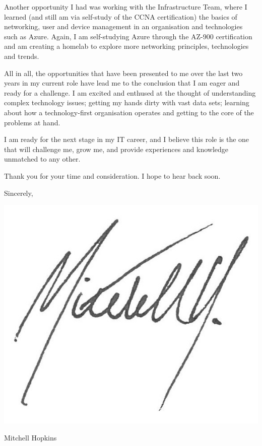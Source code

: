 \documentclass{article}
\begin{document}
Another opportunity I had was working with the Infrastructure Team, where I learned (and still am via self-study of the CCNA certification) the basics of networking, user and device management in an organisation and technologies such as Azure. Again, I am self-studying Azure through the AZ-900 certification and am creating a homelab to explore more networking principles, technologies and trends. \medskip

All in all, the opportunities that have been presented to me over the last two years in my current role have lead me to the conclusion that I am eager and ready for a challenge. I am excited and enthused at the thought of understanding complex technology issues; getting my hands dirty with vast data sets; learning about how a technology-first organisation operates and getting to the core of the problems at hand. \medskip

I am ready for the next stage in my IT career, and I believe this role is the one that will challenge me, grow me, and provide experiences and knowledge unmatched to any other. \medskip

Thank you for your time and consideration. I hope to hear back soon. \medskip

Sincerely, \par \medskip

\includegraphics[height=4\baselineskip]{sig}\par
Mitchell Hopkins \par
\end{document}
